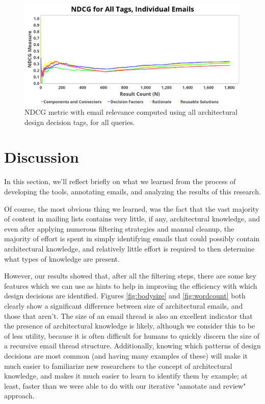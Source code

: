 \documentclass[a4paper, 12pt]{article}
\begin{document}
		\begin{figure}
			\centering
			\includegraphics[width=\textwidth]{report/all_tags_email_ndcg.png}
			\caption{NDCG metric with email relevance computed using all architectural design decision tags, for all queries.}
			\label{fig:ndcgemailall}
		\end{figure}

\section{Discussion}
	In this section, we'll reflect briefly on what we learned from the process of developing the tools, annotating emails, and analyzing the results of this research.
	
	Of course, the most obvious thing we learned, was the fact that the vast majority of content in mailing lists contains very little, if any, architectural knowledge, and even after applying numerous filtering strategies and manual cleanup, the majority of effort is spent in simply identifying emails that could possibly contain architectural knowledge, and relatively little effort is required to then determine what types of knowledge are present.
	
	However, our results showed that, after all the filtering steps, there are some key features which we can use as hints to help in improving the efficiency with which design decisions are identified. Figures \ref{fig:bodysize} and \ref{fig:wordcount} both clearly show a significant difference between size of architectural emails, and those that aren't. The size of an email thread is also an excellent indicator that the presence of architectural knowledge is likely, although we consider this to be of less utility, because it is often difficult for humans to quickly discern the size of a recursive email thread structure. Additionally, knowing which patterns of design decisions are most common (and having many examples of these) will make it much easier to familiarize new researchers to the concept of architectural knowledge, and makes it much easier to learn to identify them by example; at least, faster than we were able to do with our iterative "annotate and review" approach.
	
\end{document}
